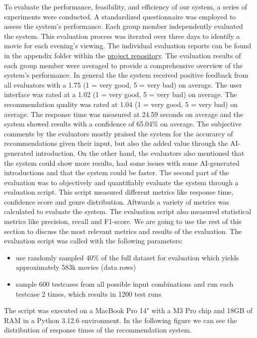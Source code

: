 \documentclass[12pt,a4paper]{article}
\begin{document}
To evaluate the performance, feasibility, and efficiency of our system, a series of experiments were conducted.
A standardized questionnaire was employed to assess the system’s performance.
Each group member independently evaluated the system.
This evaluation process was iterated over three days to identify a movie for each evening’s viewing.
The individual evaluation reports can be found in the appendix folder within the
\href{https://github.com/IImpaq/movie-finder/appendix}{project repository}.
The evaluation results of each group member were averaged to provide a comprehensive overview of the system’s performance.
In general the the system received positive feedback from all evaluators with a 1.75 (1 = very good, 5 = very bad) on average.
The user interface was rated at a 1.02 (1 = very good, 5 = very bad) on average.
The recommendation quality was rated at 1.04 (1 = very good, 5 = very bad) on average.
The response time was measured at 24.59 seconds on average and the system showed results with a confidence of 65.04\% on average.
The subjective comments by the evaluators mostly praised the system for the accurarcy of recommendations given their input, but also the added value through the AI-generated introduction.
On the other hand, the evaluators also mentioned that the system could show more results, had some issues with some AI-generated introductions and that the system could be faster.
\newline \noindent The second part of the evaluation was to objectively and quantifiably evaluate the system through a evaluation script.
This script measured different metrics like response time, confidence score and genre distribution.
Aftwards a variety of metrics was calculated to evaluate the system.
The evaluation script also measured statistical metrics like precision, recall and F1-score.
We are going to use the rest of this section to discuss the most relevant metrics and results of the evaluation.
The evaluation script was called with the following parameters:
\begin{itemize}
  \item use randomly sampled 40\% of the full dataset for evaluation which yields approximately 583k movies (data rows)
  \item sample 600 testcases from all possible input combinations and run each testcase 2 times, which results in 1200 test runs
\end{itemize}

\noindent The script was executed on a MacBook Pro 14" with a M3 Pro chip and 18GB of RAM in a Python 3.12.6 environment.
In the following figure we can see the distribution of response times of the recommendation system.
\end{document}
